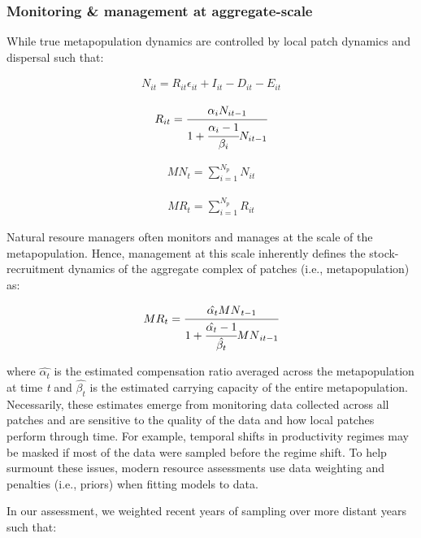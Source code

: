 \documentclass[
]{article}
\begin{document}
\hypertarget{monitoring-management-at-aggregate-scale}{%
\subsubsection{Monitoring \& management at
aggregate-scale}\label{monitoring-management-at-aggregate-scale}}

While true metapopulation dynamics are controlled by local patch
dynamics and dispersal such that:

\begin{align}
N_{it}= R_{it}\epsilon_{it}+I_{it}-D_{it}-E_{it}
\end{align}

\begin{align}
R_{it}=\cfrac{\alpha_iN_{it-1}}{1+\cfrac{\alpha_i-1}{\beta_i}N_{it-1}}
\end{align}

\begin{align}
{MN}_t = \sum_{i=1}^{N_p} N_{it}
\end{align}

\begin{align}
{MR}_t = \sum_{i=1}^{N_p} R_{it}
\end{align}

Natural resoure managers often monitors and manages at the scale of the
metapopulation. Hence, management at this scale inherently defines the
stock-recruitment dynamics of the aggregate complex of patches (i.e.,
metapopulation) as:

\begin{align}
{MR}_{t}=\cfrac{\hat{\alpha_t}{MN}_{t-1}}{1+\cfrac{\hat{\alpha_t}-1}{\hat{\beta_t}}{MN}_{it-1}}
\end{align}

where \(\hat{\alpha_t}\) is the estimated compensation ratio averaged
across the metapopulation at time \emph{t} and \(\hat{\beta_t}\) is the
estimated carrying capacity of the entire metapopulation. Necessarily,
these estimates emerge from monitoring data collected across all patches
and are sensitive to the quality of the data and how local patches
perform through time. For example, temporal shifts in productivity
regimes may be masked if most of the data were sampled before the regime
shift. To help surmount these issues, modern resource assessments use
data weighting and penalties (i.e., priors) when fitting models to data.

In our assessment, we weighted recent years of sampling over more
distant years such that:
\end{document}
